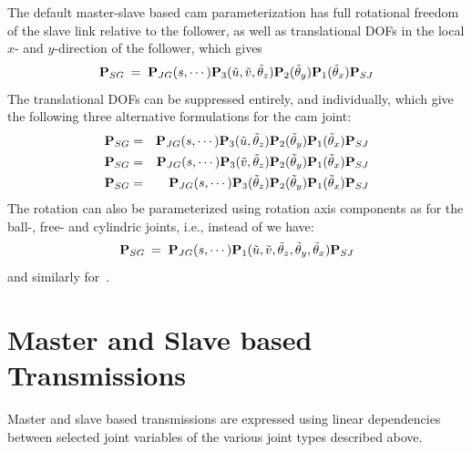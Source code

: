 
The default master-slave based cam parameterization has full rotational freedom
of the slave link relative to the follower, as well as translational DOFs in
the local $x$- and $y$-direction of the follower, which gives
%
\begin{equation}
{\bf P}_{SG} \:=\; {\bf P}_{JG}(s,\cdots)
{\bf P}_3(\tilde u,\tilde v,\tilde\theta_z)
{\bf P}_2(\tilde\theta_y)
{\bf P}_1(\tilde\theta_x)
{\bf P}_{SJ}
\label{eq:CamDef}
\end{equation}
%
The translational DOFs can be suppressed entirely, and individually,
which give the following three alternative formulations for the cam joint:
%
\begin{eqnarray}
{\mf P}_{SG} &=& {\mf P}_{JG}(s,\cdots)
{\mf P}_3(\tilde u,\tilde\theta_z)
{\mf P}_2(\tilde\theta_y)
{\mf P}_1(\tilde\theta_x)
{\mf P}_{SJ} \label{eq:CamFixY} \\
%
{\mf P}_{SG} &=& {\mf P}_{JG}(s,\cdots)
{\mf P}_3(\tilde v,\tilde\theta_z)
{\mf P}_2(\tilde\theta_y)
{\mf P}_1(\tilde\theta_x)
{\mf P}_{SJ} \label{eq:CamFixX} \\
%
{\mf P}_{SG} &=& {\mf P}_{JG}(s,\cdots)
{\mf P}_3(\tilde\theta_z)
{\mf P}_2(\tilde\theta_y)
{\mf P}_1(\tilde\theta_x)
{\mf P}_{SJ} \label{eq:CamFixBoth}
\end{eqnarray}
%
The rotation can also be parameterized using rotation axis components as for the
ball-, free- and cylindric joints, i.e., instead of  we have:
%
\begin{equation}
{\bf P}_{SG} \:=\; {\bf P}_{JG}(s,\cdots)
{\bf P}_1(\tilde u,\tilde v,\tilde\theta_z,\tilde\theta_y,\tilde\theta_x)
{\bf P}_{SJ}
\label{eq:CamDef2}
\end{equation}
%
and similarly for~.




\section{Master and Slave based Transmissions}

Master and slave based transmissions are expressed using linear dependencies
between selected joint variables of the various joint types described above.


